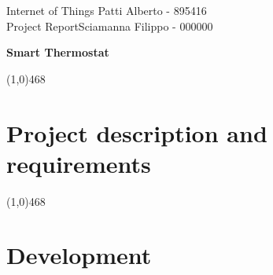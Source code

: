 \documentclass[letterpaper, 11pt]{article}
\newcommand{\hl}{\begin{center} \line(1,0){468} \end{center}} %
\newcommand{\ctitle}[1]{\begin{center} \huge{\textbf{#1}} \end{center}} %
\begin{document}
\noindent
Internet of Things \hfill  Patti Alberto - 895416\\
Project Report\hfill Sciamanna Filippo - 000000


\ctitle{Smart Thermostat}


\hl
\section*{Project description and requirements}
 

\hl 

\section*{Development}
 
\end{document}
